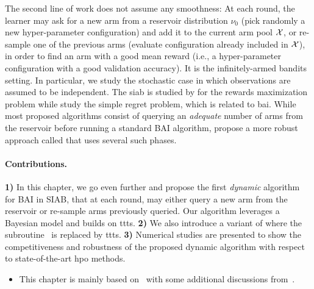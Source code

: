The second line of work does not assume any smoothness: At each round, the learner may ask for a new arm from a \gls{reservoir} distribution $\nu_0$ (pick randomly a new hyper-parameter configuration) and add it to the current arm pool $\mathcal{X}$, or re-sample one of the previous arms (evaluate configuration already included in $\mathcal{X}$), in order to find an arm with a good mean reward (i.e., a hyper-parameter configuration with a good validation accuracy). It is the \gls{infinitely-armed bandits} setting. In particular, we study the stochastic case in which observations are assumed to be independent. The \gls{siab} is studied by \citet{berry1997infinite,wang2008ucbv} for the rewards maximization problem while \citet{carpentier2015siri,aziz2018confidence} study the simple regret problem, which is related to \gls{bai}. While most proposed algorithms consist of querying an \emph{adequate} number of arms from the reservoir before running a standard BAI algorithm, \cite{li2017hyperband} propose a more robust approach called \Hyperband{} that uses several such phases.

\paragraph{Contributions.}
\textbf{1)}
In this chapter, we go even further and propose the first \emph{dynamic} algorithm for BAI in SIAB, that at each round, may either query a new arm from the reservoir or re-sample arms previously queried. Our algorithm leverages a Bayesian model and builds on \gls{ttts}. 
\textbf{2)}
We also introduce a variant of \Hyperband{} where the \SHA subroutine~\citep{karnin2013sha} is replaced by \gls{ttts}. 
\textbf{3)}
Numerical studies are presented to show the competitiveness and robustness of the proposed dynamic algorithm with respect to state-of-the-art \gls{hpo} methods.


\medskip

\begin{itemize}[label=]
    \item This chapter is mainly based on~\cite{shang2019dttts} with some additional discussions from~\cite{shang2020dttts}.
\end{itemize}

